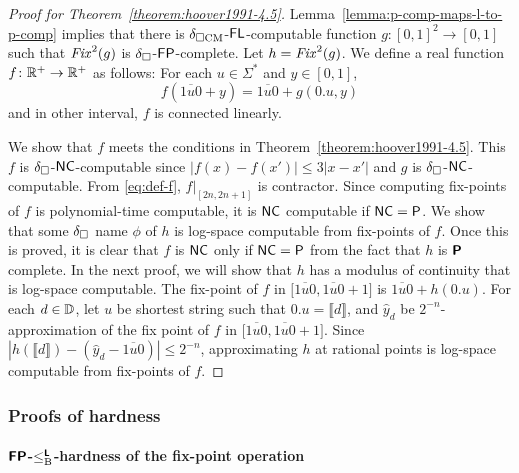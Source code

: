 \documentclass[envcountsame,orivec,oribibl]{llncs}
\begin{document}
\begin{proof}
[Proof for Theorem~\ref{theorem:hoover1991-4.5}]
 Lemma~\ref{lemma:p-comp-maps-l-to-p-comp} implies that
 there is $\delta _{\square \mathrm{CM}}$-$\mathsf{FL}$-computable function 
 $g \colon [0,1]^2 \to [0,1]$ such that $\mathit{Fix}^2(g)$ is
 $\delta _\square$-$\mathsf{FP}$-complete. Let $h = \mathit{Fix}^2(g)$.
 We define a real function $f \colon \mathbb R^+ \to \mathbb R^+$ as follows:
 For each $u \in \Sigma^*$ and $y \in [0, 1]$,
 \begin{equation}
  \label{eq:def-f}
 f(\overline{1u0} + y) = \overline{1u0} + g(0.u, y)
 \end{equation}
 and in other interval, $f$ is connected linearly.

 We show that $f$ meets the conditions in Theorem~\ref{theorem:hoover1991-4.5}.
 This $f$ is $\delta _\square$-$\mathsf{NC}$-computable since 
 $|f(x) - f(x')| \le 3|x-x'|$ and $g$ is $\delta _\square$-$\mathsf{NC}$-computable.
 From \eqref{eq:def-f},  $f|_{[2n, 2n+1]}$ is contractor.
 Since computing fix-points of $f$ is polynomial-time computable, 
 it is $\mathsf{NC}$ computable if $\mathsf{NC} = \mathsf{P}$.
 We show that some $\delta _\square$ name $\phi$ of $h$ is log-space computable 
 from fix-points of $f$.
 Once this is proved, it is clear that $f$ is $\mathsf{NC}$ only if 
 $\mathsf{NC} = \mathsf{P}$ from the fact that $h$ is $\text{\bfseries \sffamily \upshape P}$ complete.
 In the next proof, we will show that $h$ has a modulus of continuity that is
 log-space computable. 
 The fix-point of $f$ in $\bigl[ \overline{1u0}, \overline{1u0}+1 \bigr]$ is
 $\overline{1u0} + h(0.u)$.
 For each $d \in \mathbb D$, let $u$ be shortest string such that $0.u = \llbracket d \rrbracket$,
 and $\hat y_d$ be $2^{-n}$-approximation of the fix point of $f$ in
 $\bigl[ \overline{1u0}, \overline{1u0}+1 \bigr]$.
 Since  $\left|h(\llbracket d \rrbracket) - \left( \hat y_d - \overline{1u0} \right)\right| \le 2^{-n}$,
 approximating $h$ at rational points is log-space computable from fix-points of $f$.
\end{proof}




\subsubsection{Proofs of hardness}


\paragraph{$\text{\bfseries \sffamily \upshape FP}$-$\leq _{\mathrm B} ^{\text{\bfseries \sffamily \upshape L}}$-hardness of the fix-point operation}
\end{document}
